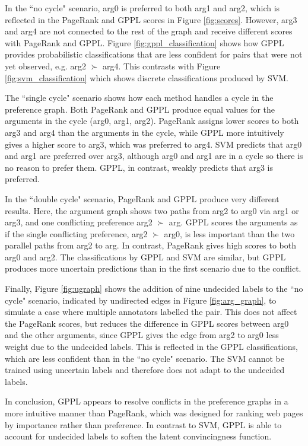 In the  ``no cycle" scenario, 
arg0 is preferred to both arg1 and arg2, which is reflected in the PageRank and GPPL scores in Figure \ref{fig:scores}. However, arg3 and arg4 are not connected to the rest of the graph and receive different scores with PageRank and GPPL. 
Figure \ref{fig:gppl_classification} shows how GPPL provides probabilistic classifications that are less confident for pairs that were not yet observed, e.g. arg2 $\succ$ arg4. This contrasts with Figure \ref{fig:svm_classification} which shows discrete classifications produced by SVM.

The ``single cycle" scenario shows how each method handles a cycle in the preference graph.
Both PageRank and GPPL produce equal values for the arguments in the cycle (arg0, arg1, arg2). PageRank assigns lower scores to both arg3 and arg4 than the arguments in the cycle, 
while GPPL more intuitively gives a higher score to arg3, which was preferred to arg4. 
SVM predicts that arg0 and arg1 are preferred over arg3, 
although arg0 and arg1 are in a cycle so there is no reason to prefer them. 
GPPL, in contrast,  weakly predicts that arg3 is preferred.

In the ``double cycle" scenario, PageRank and GPPL produce very different results.
Here, the argument graph shows two paths from arg2 to arg0 via arg1 or arg3, and one conflicting
preference arg2 $\succ$ arg. 
GPPL scores the arguments as if the single conflicting preference, arg2 $\succ$ arg0, 
is less important than the two parallel paths from arg2 to arg. 
In contrast, PageRank gives high scores to both arg0 and arg2.
The classifications by GPPL and SVM are similar, but GPPL produces more uncertain 
predictions than in the first scenario due to the conflict.

Finally,  Figure \ref{fig:ugraph} shows the addition of nine undecided labels to the ``no cycle" scenario, indicated by 
undirected edges in Figure \ref{fig:arg_graph}, to simulate a case where multiple annotators labelled the pair.
This does not affect the PageRank scores, 
but reduces the difference in GPPL scores between arg0 and the other arguments, 
since GPPL gives the edge from arg2 to arg0 less weight due to the undecided labels. 
This is reflected in the GPPL classifications, which are less confident than in the ``no cycle" scenario.
The SVM cannot be trained using uncertain labels and therefore does not adapt to the undecided labels. 

In conclusion, GPPL appears to resolve conflicts in the preference graphs in a
more intuitive manner than PageRank, which was designed for ranking web pages by 
importance rather than preference. 
In contrast to SVM, GPPL is able to account for undecided labels to soften the latent convincingness function.

